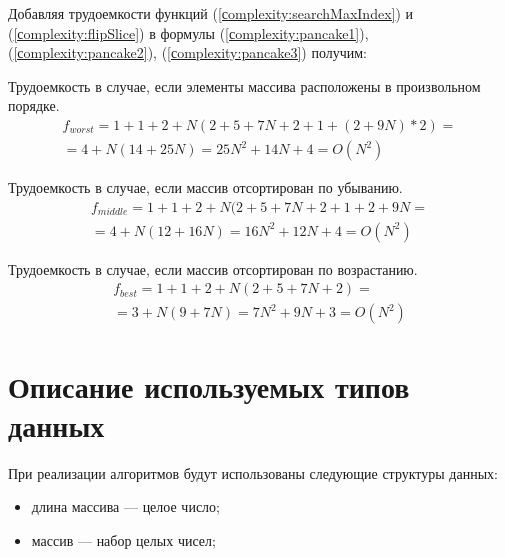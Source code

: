 Добавляя трудоемкости функций (\ref{сomplexity:searchMaxIndex}) и (\ref{сomplexity:flipSlice}) в формулы
(\ref{сomplexity:pancake1}), (\ref{сomplexity:pancake2}), (\ref{сomplexity:pancake3}) получим:

Трудоемкость в случае, если элементы массива расположены в произвольном порядке.
\begin{equation}
    \label{сomplexity:pancake1}
    \begin{gathered}
        f_{worst} = 1 + 1 + 2 + N(2 + 5 + 7N + 2 + 1 + (2 + 9N) * 2) = \\
            = 4 + N(14 + 25N) = 25N^2 + 14N + 4 = O(N^2)
    \end{gathered}
\end{equation}

Трудоемкость в случае, если массив отсортирован по убыванию.
\begin{equation}
    \label{сomplexity:pancake2}
    \begin{gathered}
        f_{middle} = 1 + 1 + 2 + N(2 + 5 + 7N + 2 + 1 + 2 + 9N = \\
            = 4 + N(12 + 16N) = 16N^2 + 12N + 4 = O(N^2)
    \end{gathered}
\end{equation}

Трудоемкость в случае, если массив отсортирован по возрастанию.
\begin{equation}
    \label{сomplexity:pancake3}
    \begin{gathered}
        f_{best} = 1 + 1 + 2 + N(2 + 5 + 7N + 2) = \\
            = 3 + N(9 + 7N) = 7N^2 + 9N + 3 = O(N^2)
    \end{gathered}
\end{equation}

\section{Описание используемых типов данных}

При реализации алгоритмов будут использованы следующие структуры данных:

\begin{itemize}
	\item длина массива --- целое число;
	\item массив --- набор целых чисел;
\end{itemize}

